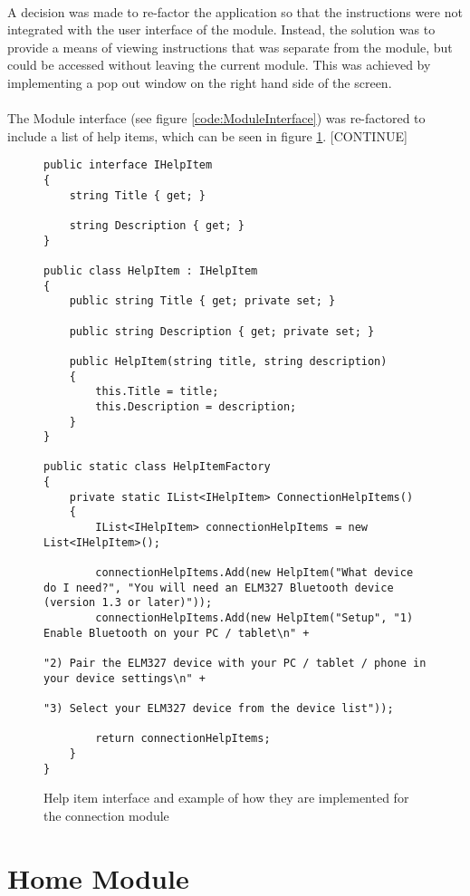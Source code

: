 		\paragraph{}{
		A decision was made to re-factor the application so that the instructions were not integrated with the user interface of the module. Instead, the solution was to provide a means of viewing instructions that was separate from the module, but could be accessed without leaving the current module. This was achieved by implementing a pop out window on the right hand side of the screen.
		}
		\paragraph{}{
		The Module interface (see figure \ref{code:ModuleInterface}) was re-factored to include a list of help items, which can be seen in figure \ref{code:HelpItem}. [CONTINUE]
		}
		\begin{figure}[h]
			\begin{lstlisting}
public interface IHelpItem
{
    string Title { get; }

	string Description { get; }
}

public class HelpItem : IHelpItem
{
	public string Title { get; private set; }

	public string Description { get; private set; }

	public HelpItem(string title, string description)
	{
		this.Title = title;
		this.Description = description;
	}
}

public static class HelpItemFactory
{
	private static IList<IHelpItem> ConnectionHelpItems()
	{
    	IList<IHelpItem> connectionHelpItems = new List<IHelpItem>();

		connectionHelpItems.Add(new HelpItem("What device do I need?", "You will need an ELM327 Bluetooth device (version 1.3 or later)"));
        connectionHelpItems.Add(new HelpItem("Setup", "1) Enable Bluetooth on your PC / tablet\n" +
                                                          "2) Pair the ELM327 device with your PC / tablet / phone in your device settings\n" +
                                                          "3) Select your ELM327 device from the device list"));

    	return connectionHelpItems;
	}	
}
			\end{lstlisting}
			\caption{Help item interface and example of how they are implemented for the connection module}
			\label{code:HelpItem}
		\end{figure}
	
\section{Home Module}
		\paragraph{}{
		}
	
